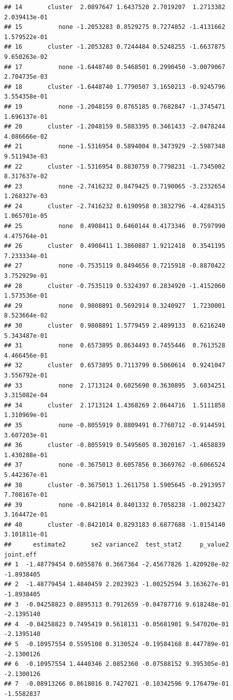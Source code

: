 \documentclass[
]{article}
\begin{document}
\begin{verbatim}
## 14       cluster  2.0897647 1.6437520 2.7019207  1.2713382 2.039413e-01
## 15          none -1.2053283 0.8529275 0.7274852 -1.4131662 1.579522e-01
## 16       cluster -1.2053283 0.7244484 0.5248255 -1.6637875 9.650263e-02
## 17          none -1.6448740 0.5468501 0.2990450 -3.0079067 2.704735e-03
## 18       cluster -1.6448740 1.7790507 3.1650213 -0.9245796 3.554358e-01
## 19          none -1.2048159 0.8765185 0.7682847 -1.3745471 1.696137e-01
## 20       cluster -1.2048159 0.5883395 0.3461433 -2.0478244 4.086666e-02
## 21          none -1.5316954 0.5894004 0.3473929 -2.5987348 9.511943e-03
## 22       cluster -1.5316954 0.8830759 0.7798231 -1.7345002 8.317637e-02
## 23          none -2.7416232 0.8479425 0.7190065 -3.2332654 1.268327e-03
## 24       cluster -2.7416232 0.6190958 0.3832796 -4.4284315 1.065701e-05
## 25          none  0.4908411 0.6460144 0.4173346  0.7597990 4.475764e-01
## 26       cluster  0.4908411 1.3860887 1.9212418  0.3541195 7.233334e-01
## 27          none -0.7535119 0.8494656 0.7215918 -0.8870422 3.752929e-01
## 28       cluster -0.7535119 0.5324397 0.2834920 -1.4152060 1.573536e-01
## 29          none  0.9808891 0.5692914 0.3240927  1.7230001 8.523664e-02
## 30       cluster  0.9808891 1.5779459 2.4899133  0.6216240 5.343487e-01
## 31          none  0.6573895 0.8634493 0.7455446  0.7613528 4.466456e-01
## 32       cluster  0.6573895 0.7113799 0.5060614  0.9241047 3.556792e-01
## 33          none  2.1713124 0.6025690 0.3630895  3.6034251 3.315082e-04
## 34       cluster  2.1713124 1.4368269 2.0644716  1.5111858 1.310969e-01
## 35          none -0.8055919 0.8809491 0.7760712 -0.9144591 3.607203e-01
## 36       cluster -0.8055919 0.5495605 0.3020167 -1.4658839 1.430288e-01
## 37          none -0.3675013 0.6057856 0.3669762 -0.6066524 5.442367e-01
## 38       cluster -0.3675013 1.2611758 1.5905645 -0.2913957 7.708167e-01
## 39          none -0.8421014 0.8401332 0.7058238 -1.0023427 3.164472e-01
## 40       cluster -0.8421014 0.8293183 0.6877688 -1.0154140 3.101811e-01
##      estimate2       se2 variance2  test_stat2     p_value2  joint.eff
## 1  -1.48779454 0.6055876 0.3667364 -2.45677826 1.420928e-02 -1.8938405
## 2  -1.48779454 1.4840459 2.2023923 -1.00252594 3.163627e-01 -1.8938405
## 3  -0.04258823 0.8895313 0.7912659 -0.04787716 9.618248e-01 -2.1395140
## 4  -0.04258823 0.7495419 0.5618131 -0.05681901 9.547020e-01 -2.1395140
## 5  -0.10957554 0.5595108 0.3130524 -0.19584168 8.447789e-01 -2.1300126
## 6  -0.10957554 1.4440346 2.0852360 -0.07588152 9.395305e-01 -2.1300126
## 7  -0.08913266 0.8618016 0.7427021 -0.10342596 9.176479e-01 -1.5582837

\end{verbatim}
\end{document}
